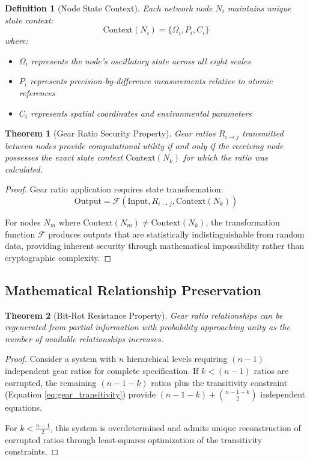 \documentclass[12pt,a4paper]{article}
\newtheorem{theorem}{Theorem}
\newtheorem{definition}{Definition}
\begin{document}
\begin{definition}[Node State Context]
Each network node $N_i$ maintains unique state context:
\begin{equation}
\text{Context}(N_i) = \{\Omega_i, P_i, C_i\}
\end{equation}
where:
\begin{itemize}
\item $\Omega_i$ represents the node's oscillatory state across all eight scales
\item $P_i$ represents precision-by-difference measurements relative to atomic references
\item $C_i$ represents spatial coordinates and environmental parameters
\end{itemize}
\end{definition}

\begin{theorem}[Gear Ratio Security Property]
Gear ratios $R_{i \to j}$ transmitted between nodes provide computational utility if and only if the receiving node possesses the exact state context $\text{Context}(N_k)$ for which the ratio was calculated.
\end{theorem}

\begin{proof}
Gear ratio application requires state transformation:
\begin{equation}
\text{Output} = \mathcal{F}(\text{Input}, R_{i \to j}, \text{Context}(N_k))
\end{equation}

For nodes $N_m$ where $\text{Context}(N_m) \neq \text{Context}(N_k)$, the transformation function $\mathcal{F}$ produces outputs that are statistically indistinguishable from random data, providing inherent security through mathematical impossibility rather than cryptographic complexity.
\end{proof}

\subsection{Mathematical Relationship Preservation}

\begin{theorem}[Bit-Rot Resistance Property]
Gear ratio relationships can be regenerated from partial information with probability approaching unity as the number of available relationships increases.
\end{theorem}

\begin{proof}
Consider a system with $n$ hierarchical levels requiring $(n-1)$ independent gear ratios for complete specification. If $k < (n-1)$ ratios are corrupted, the remaining $(n-1-k)$ ratios plus the transitivity constraint (Equation \ref{eq:gear_transitivity}) provide $(n-1-k) + \binom{n-1-k}{2}$ independent equations.

For $k < \frac{n-1}{2}$, this system is overdetermined and admits unique reconstruction of corrupted ratios through least-squares optimization of the transitivity constraints.
\end{proof}
\end{document}
